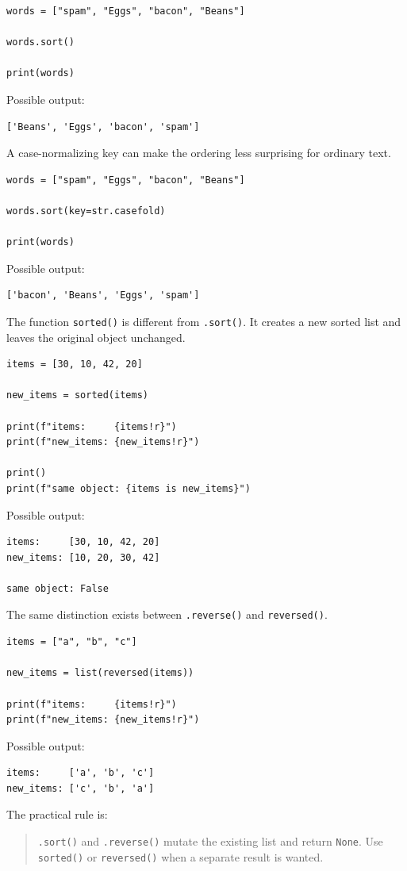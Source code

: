 \begin{verbatim}
words = ["spam", "Eggs", "bacon", "Beans"]

words.sort()

print(words)
\end{verbatim}

Possible output:

\begin{verbatim}
['Beans', 'Eggs', 'bacon', 'spam']
\end{verbatim}

A case-normalizing key can make the ordering less surprising for ordinary text.

\begin{verbatim}
words = ["spam", "Eggs", "bacon", "Beans"]

words.sort(key=str.casefold)

print(words)
\end{verbatim}

Possible output:

\begin{verbatim}
['bacon', 'Beans', 'Eggs', 'spam']
\end{verbatim}

The function \texttt{sorted()} is different from \texttt{.sort()}. It creates a new sorted list and leaves the original object unchanged.

\begin{verbatim}
items = [30, 10, 42, 20]

new_items = sorted(items)

print(f"items:     {items!r}")
print(f"new_items: {new_items!r}")

print()
print(f"same object: {items is new_items}")
\end{verbatim}

Possible output:

\begin{verbatim}
items:     [30, 10, 42, 20]
new_items: [10, 20, 30, 42]

same object: False
\end{verbatim}

The same distinction exists between \texttt{.reverse()} and \texttt{reversed()}.

\begin{verbatim}
items = ["a", "b", "c"]

new_items = list(reversed(items))

print(f"items:     {items!r}")
print(f"new_items: {new_items!r}")
\end{verbatim}

Possible output:

\begin{verbatim}
items:     ['a', 'b', 'c']
new_items: ['c', 'b', 'a']
\end{verbatim}

The practical rule is:

\begin{quote}
\texttt{.sort()} and \texttt{.reverse()} mutate the existing list and return \texttt{None}. Use \texttt{sorted()} or \texttt{reversed()} when a separate result is wanted.
\end{quote}